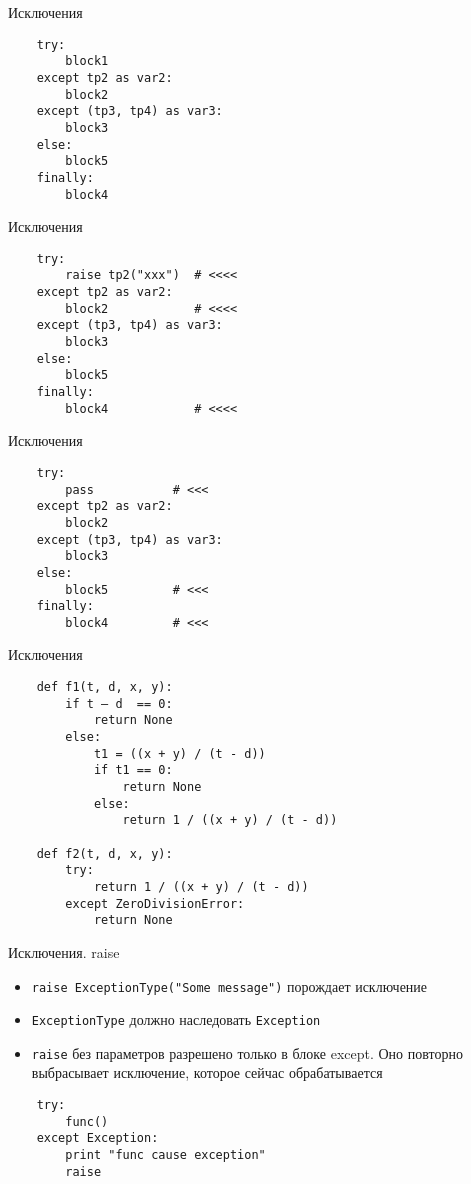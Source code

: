 \documentclass{article}
\begin{document}

\begin{center} Исключения \end{center}
\begin{lstlisting}
	try:
		block1
	except tp2 as var2:
		block2
	except (tp3, tp4) as var3:
		block3
	else:
		block5
	finally:
		block4

\end{lstlisting}
\newpage

\begin{center} Исключения \end{center}
\begin{lstlisting}
	try:
		raise tp2("xxx")  # <<<<
	except tp2 as var2:
		block2            # <<<<
	except (tp3, tp4) as var3:
		block3
	else:
		block5
	finally:
		block4            # <<<<
\end{lstlisting}
\newpage

\begin{center} Исключения \end{center}
\begin{lstlisting}
	try:
		pass           # <<<
	except tp2 as var2:
		block2
	except (tp3, tp4) as var3:
		block3
	else:
		block5         # <<<
	finally:
		block4         # <<<
\end{lstlisting}
\newpage

\begin{center} Исключения \end{center}
\begin{lstlisting}
	def f1(t, d, x, y):
		if t – d  == 0:
		    return None
		else:
		    t1 = ((x + y) / (t - d))
		    if t1 == 0:
		        return None
		    else:
		        return 1 / ((x + y) / (t - d))

	def f2(t, d, x, y):
		try:
		    return 1 / ((x + y) / (t - d))
		except ZeroDivisionError:
		    return None
\end{lstlisting}
\newpage

\begin{center} Исключения. raise \end{center}
\begin{itemize}
	\item \lstinline!raise ExceptionType("Some message")! порождает исключение
	\item \lstinline!ExceptionType! должно наследовать \lstinline!Exception!
	\item \lstinline!raise! без параметров разрешено только в блоке except. 
		Оно повторно выбрасывает исключение, которое сейчас обрабатывается
\end{itemize}
\begin{lstlisting}
	try:
		func()
	except Exception:
		print "func cause exception"
		raise
\end{lstlisting}
\newpage
\end{document}
